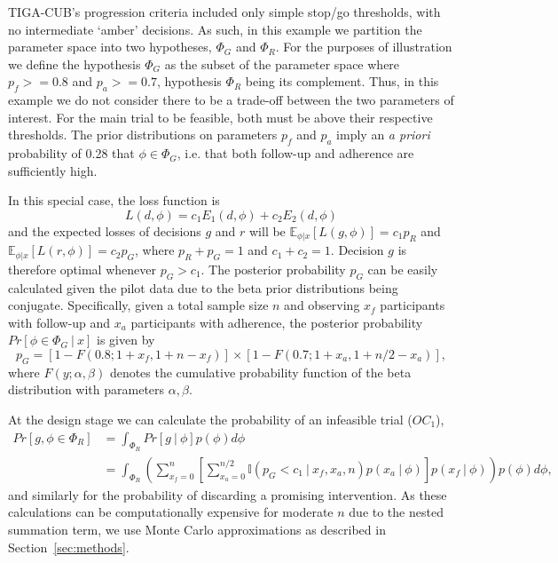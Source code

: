 \documentclass[AMA,STIX1COL]{WileyNJD-v2}
\begin{document}
TIGA-CUB's progression criteria included only simple stop/go thresholds, with no intermediate `amber' decisions. As such, in this example we partition the parameter space into two hypotheses, $\Phi_G$ and $\Phi_R$. For the purposes of illustration we define the hypothesis $\Phi_G$ as the subset of the parameter space where $p_f >= 0.8$ and $p_a >= 0.7$, hypothesis $\Phi_R$ being its complement. Thus, in this example we do not consider there to be a trade-off between the two parameters of interest. For the main trial to be feasible, both must be above their respective thresholds. The prior distributions on parameters $p_f$ and $p_a$ imply an \emph{a priori} probability of 0.28 that $\phi \in \Phi_G$, i.e. that both follow-up and adherence are sufficiently high.

In this special case, the loss function is 
$$
L(d, \phi) = c_1 E_1(d, \phi) + c_2 E_2(d, \phi)
$$
and the expected losses of decisions $g$ and $r$ will be $\mathbb{E}_{\phi | x}[L(g, \phi)] = c_1 p_R$ and $\mathbb{E}_{\phi | x}[L(r, \phi)] = c_2 p_G $, where $p_R + p_G = 1$ and $c_1 + c_2 = 1$. Decision $g$ is therefore optimal whenever $p_G > c_1$. The posterior probability $p_G$ can be easily calculated given the pilot data due to the beta prior distributions being conjugate. Specifically, given a total sample size $n$ and observing $x_f$ participants with follow-up and $x_a$ participants with adherence, the posterior probability $Pr[\phi \in \Phi_G ~|~ x]$ is given by
\begin{equation}
p_G = [1 - F(0.8; 1+x_f, 1+n-x_f)] \times [1 - F(0.7; 1+x_a, 1 + n/2 - x_a)],
\end{equation}
where $F(y; \alpha, \beta)$ denotes the cumulative probability function of the beta distribution with parameters $\alpha, \beta$.

At the design stage we can calculate the probability of an infeasible trial ($OC_1$),
\begin{align}
Pr[g, \phi \in \Phi_R] &= \int_{\Phi_R} Pr[g ~|~ \phi] p(\phi) d\phi \\
 &= \int_{\Phi_R} \left( \sum_{x_f = 0}^{n} \left[ \sum_{x_a = 0}^{n/2}  \mathbb{I}(p_G < c_1 ~|~ x_f, x_a, n) p(x_a ~|~ \phi) \right]p(x_f ~|~ \phi) \right)p(\phi) d\phi,
\end{align}
and similarly for the probability of discarding a promising intervention. As these calculations can be computationally expensive for moderate $n$ due to the nested summation term, we use Monte Carlo approximations as described in Section~\ref{sec:methods}. 
\end{document}
